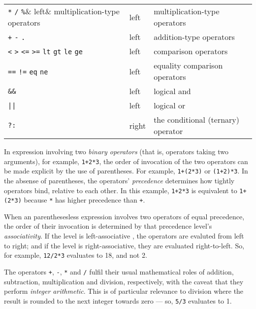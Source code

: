 \documentclass[a4paper,11pt,oneside]{book}
\def\textitidx#1{\textit{#1}\index{#1}}
\begin{document}
\begin{tabular}{l@{\quad}l@{\quad}l}
\verb+*+ \verb+/+ \verb+%+& left& multiplication-type operators\\
\verb-+- \verb+-+ \verb+.+& left& addition-type operators\\
\verb+<+ \verb+>+ \verb+<=+ \verb+>=+ \verb+lt+ \verb+gt+ \verb+le+ \verb+ge+&
                            left& comparison operators\\
\verb+==+ \verb+!=+ \verb+eq+ \verb+ne+&
                            left& equality comparison operators\\
\verb+&&+&                  left& logical and\\
\verb+||+&                  left& logical or\\
\verb+?:+&                  right& the conditional (ternary) operator\\
\end{tabular}

In expression involving two \textit{binary operators}
(that is, operators taking two arguments), for example, \verb-1+2*3-, 
the order of invocation of the two operators can be made explicit by the use
of parentheses.  For example, \verb-1+(2*3)- or 
\verb-(1+2)*3-.  In the absense of parentheses, the operators' 
\textit{precedence} determines how tightly operators bind, relative to each 
other.  In this example, \verb-1+2*3- is equivalent to \verb-1+(2*3)- because
\verb+*+ has higher precedence than \verb-+-.

When an parenthesesless expression involves two operators of equal 
precedence, the order of their invocation is determined by that 
precedence level's \textit{associativity}.  If the level is left-associative%
, 
the operators are evaluted from left to right; and if the level is 
right-associative, they 
are evaluated right-to-left.  So, for example, \verb+12/2*3+ evaluates to 18,
and not 2.

The operators \verb-+-, \verb+-+, \verb+*+ and \verb+/+ fulfil their
usual mathematical roles of addition, 
subtraction, multiplication
and division, respectively, with the caveat that they
perform \textitidx{integer arithmetic}.  This is of particular relevance
to division where the result is rounded to the next integer towards zero ---
so, \verb+5/3+ evaluates to 1.
\end{document}
